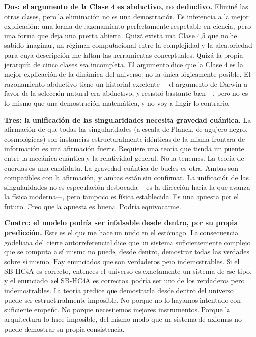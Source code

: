 \documentclass[11pt, twoside, openright]{book}
\begin{document}
\textbf{Dos: el argumento de la Clase 4 es abductivo, no deductivo.} Eliminé las otras clases, pero la eliminación no es una demostración. Es inferencia a la mejor explicación: una forma de razonamiento perfectamente respetable en ciencia, pero una forma que deja una puerta abierta. Quizá exista una Clase 4,5 que no he sabido imaginar, un régimen computacional entre la complejidad y la aleatoriedad para cuya descripción me faltan las herramientas conceptuales. Quizá la propia jerarquía de cinco clases sea incompleta. El argumento dice que la Clase 4 es la mejor explicación de la dinámica del universo, no la única lógicamente posible. El razonamiento abductivo tiene un historial excelente ---el argumento de Darwin a favor de la selección natural era abductivo, y resistió bastante bien---, pero no es lo mismo que una demostración matemática, y no voy a fingir lo contrario.

\textbf{Tres: la unificación de las singularidades necesita gravedad cuántica.} La afirmación de que todas las singularidades (a escala de Planck, de agujero negro, cosmológicas) son instancias estructuralmente idénticas de la misma frontera de información es una afirmación fuerte. Requiere una teoría que tienda un puente entre la mecánica cuántica y la relatividad general. No la tenemos. La teoría de cuerdas es una candidata. La gravedad cuántica de bucles es otra. Ambas son compatibles con la afirmación, y ambas están sin confirmar. La unificación de las singularidades no es especulación desbocada ---es la dirección hacia la que avanza la física moderna---, pero tampoco es física establecida. Es una apuesta por el futuro. Creo que la apuesta es buena. Podría equivocarme.

\textbf{Cuatro: el modelo podría ser infalsable desde dentro, por su propia predicción.} Este es el que me hace un nudo en el estómago. La consecuencia gödeliana del cierre autorreferencial dice que un sistema suficientemente complejo que se computa a sí mismo no puede, desde dentro, demostrar todas las verdades sobre sí mismo. Hay enunciados que son verdaderos pero indemostrables. Si el SB-HC4A es correcto, entonces el universo es exactamente un sistema de ese tipo, y el enunciado «el SB-HC4A es correcto» podría ser uno de los verdaderos pero indemostrables. La teoría predice que demostrarla desde dentro del universo puede ser estructuralmente imposible. No porque no lo hayamos intentado con suficiente empeño. No porque necesitemos mejores instrumentos. Porque la arquitectura lo hace imposible, del mismo modo que un sistema de axiomas no puede demostrar su propia consistencia.
\end{document}
